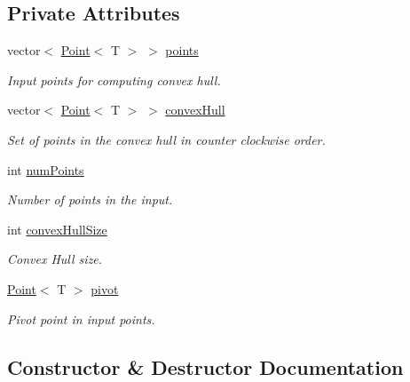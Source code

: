 \subsection*{Private Attributes}
\begin{DoxyCompactItemize}
\item 
vector$<$ \mbox{\hyperlink{classPoint}{Point}}$<$ T $>$ $>$ \mbox{\hyperlink{classChan_a492d7e3f31f1fd1e06f5ff464eec0492}{points}}
\begin{DoxyCompactList}\small\item\em Input points for computing convex hull. \end{DoxyCompactList}\item 
vector$<$ \mbox{\hyperlink{classPoint}{Point}}$<$ T $>$ $>$ \mbox{\hyperlink{classChan_a6b189fb8de493f51a989f5c90dc7bbcc}{convex\+Hull}}
\begin{DoxyCompactList}\small\item\em Set of points in the convex hull in counter clockwise order. \end{DoxyCompactList}\item 
int \mbox{\hyperlink{classChan_a9f5d5339db322fa4a378af0832b31da9}{num\+Points}}
\begin{DoxyCompactList}\small\item\em Number of points in the input. \end{DoxyCompactList}\item 
int \mbox{\hyperlink{classChan_a366f3dd178f14b5e146e6a80aea8e039}{convex\+Hull\+Size}}
\begin{DoxyCompactList}\small\item\em Convex Hull size. \end{DoxyCompactList}\item 
\mbox{\hyperlink{classPoint}{Point}}$<$ T $>$ \mbox{\hyperlink{classChan_a601408ef7e50863dd345e86e519710bc}{pivot}}
\begin{DoxyCompactList}\small\item\em Pivot point in input points. \end{DoxyCompactList}\end{DoxyCompactItemize}


\subsection{Constructor \& Destructor Documentation}
\mbox{\label{classChan_ac5b684c05344e32e6ec76d781b676634}} 

